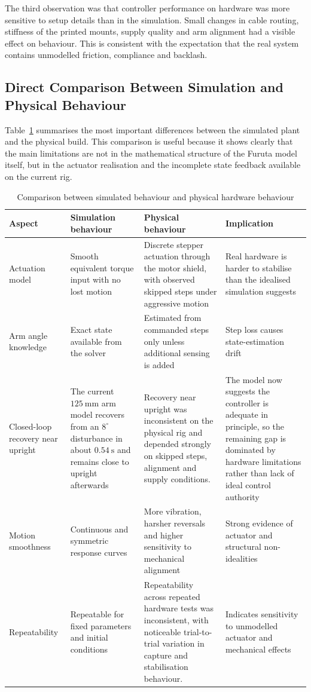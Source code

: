 \documentclass[conference]{IEEEtran}
\begin{document}
The third observation was that controller performance on hardware was more sensitive to setup details than in the simulation. Small changes in cable routing, stiffness of the printed mounts, supply quality and arm alignment had a visible effect on behaviour. This is consistent with the expectation that the real system contains unmodelled friction, compliance and backlash.

\subsection{Direct Comparison Between Simulation and Physical Behaviour}
Table~\ref{tab:sim_vs_hardware} summarises the most important differences between the simulated plant and the physical build. This comparison is useful because it shows clearly that the main limitations are not in the mathematical structure of the Furuta model itself, but in the actuator realisation and the incomplete state feedback available on the current rig.

\begin{table}[!t]
\centering
\caption{Comparison between simulated behaviour and physical hardware behaviour}
\label{tab:sim_vs_hardware}
{\footnotesize
\begin{tabular}{|p{2.55cm}|p{4.2cm}|p{4.5cm}|p{3.1cm}|}
\hline
Aspect & Simulation behaviour & Physical behaviour & Implication \\
\hline
Actuation model & Smooth equivalent torque input with no lost motion & Discrete stepper actuation through the motor shield, with observed skipped steps under aggressive motion & Real hardware is harder to stabilise than the idealised simulation suggests \\
\hline
Arm angle knowledge & Exact state available from the solver & Estimated from commanded steps only unless additional sensing is added & Step loss causes state-estimation drift \\
\hline
Closed-loop recovery near upright & The current $125~\mathrm{mm}$ arm model recovers from an $8^\circ$ disturbance in about $0.54~\mathrm{s}$ and remains close to upright afterwards & Recovery near upright was inconsistent on the physical rig and depended strongly on skipped steps, alignment and supply conditions. & The model now suggests the controller is adequate in principle, so the remaining gap is dominated by hardware limitations rather than lack of ideal control authority \\
\hline
Motion smoothness & Continuous and symmetric response curves & More vibration, harsher reversals and higher sensitivity to mechanical alignment & Strong evidence of actuator and structural non-idealities \\
\hline
Repeatability & Repeatable for fixed parameters and initial conditions & Repeatability across repeated hardware tests was inconsistent, with noticeable trial-to-trial variation in capture and stabilisation behaviour. & Indicates sensitivity to unmodelled actuator and mechanical effects \\
\hline
\end{tabular}
}
\end{table}
\end{document}
